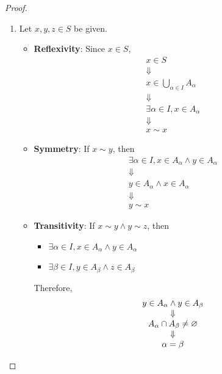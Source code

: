 \begin{proof}
    \begin{enumerate}[label=\textbf{(\Alph*)}]
        \item Let $x, y, z \in S$ be given.
        \begin{itemize}
            \item \textbf{Reflexivity}: Since $x \in S$,
            \[
            \begin{array}{c}
            x \in S \\
            \Downarrow \\
            x \in \bigcup_{\alpha \in I} A_{\alpha} \\
            \Downarrow \\
            \exists \alpha \in I, x \in A_{\alpha} \\
            \Downarrow \\
            x \sim x
            \end{array}
            \]
            \item \textbf{Symmetry}: If $x \sim y$, then
            \[
            \begin{array}{c}
            \exists \alpha \in I, x \in A_{\alpha} \land y \in A_{\alpha} \\
            \Downarrow \\
            y \in A_{\alpha} \land x \in A_{\alpha} \\
            \Downarrow \\
            y \sim x
            \end{array}
            \]
            \item \textbf{Transitivity}: If $x \sim y \land y \sim z$, then
            \begin{itemize}
                \item $\exists \alpha \in I, x \in A_{\alpha} \land y \in A_{\alpha}$
                \item $\exists \beta \in I, y \in A_{\beta} \land z \in A_{\beta}$
            \end{itemize}
            Therefore,
            \[
            \begin{array}{c}
            y \in A_{\alpha} \land y \in A_{\beta} \\
            \Downarrow \\
            A_{\alpha} \cap A_{\beta} \neq \varnothing \\
            \Downarrow \\
            \alpha = \beta \\

\end{array}\]
\end{itemize}
\end{enumerate}
\end{proof}

